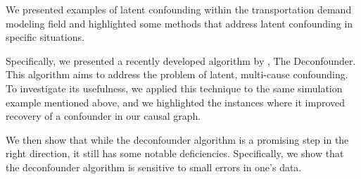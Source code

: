 We presented examples of latent confounding within the transportation demand modeling field and highlighted
some methods that address latent confounding in specific situations.

Specifically, we presented a recently developed algorithm by \citet{wang_2019_blessings}, The Deconfounder.
This algorithm aims to address the problem of latent, multi-cause confounding.
To investigate its usefulness, we applied this technique to the same simulation example mentioned above, and we highlighted the instances where it improved recovery of a confounder in our causal graph.

We then show that while the deconfounder algorithm is a promising step in the right direction, 
it still has some notable deficiencies. Specifically, we show that the deconfounder algorithm is 
sensitive to small errors in one's data.

